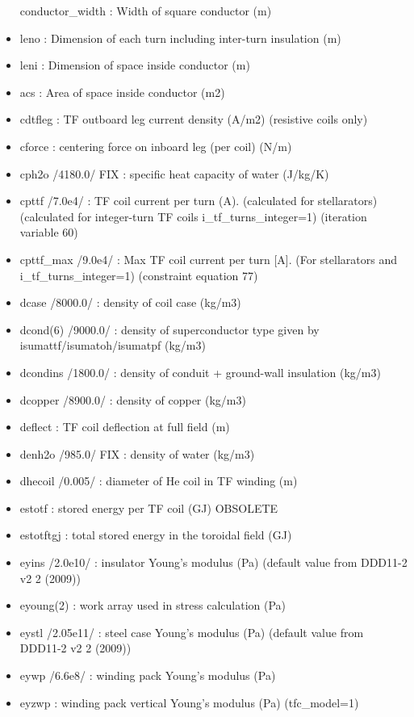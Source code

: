 \documentclass[]{article}
\begin{document}
\begin{itemize}
  conductor\_width : Width of square conductor (m)
\item
  leno : Dimension of each turn including inter-turn insulation (m)
\item
  leni : Dimension of space inside conductor (m)
\item
  acs : Area of space inside conductor (m2)
\item
  cdtfleg : TF outboard leg current density (A/m2) (resistive coils
  only)
\item
  cforce : centering force on inboard leg (per coil) (N/m)
\item
  cph2o /4180.0/ FIX : specific heat capacity of water (J/kg/K)
\item
  cpttf /7.0e4/ : TF coil current per turn (A). (calculated for
  stellarators) (calculated for integer-turn TF coils
  i\_tf\_turns\_integer=1) (iteration variable 60)
\item
  cpttf\_max /9.0e4/ : Max TF coil current per turn {[}A{]}. (For
  stellarators and i\_tf\_turns\_integer=1) (constraint equation 77)
\item
  dcase /8000.0/ : density of coil case (kg/m3)
\item
  dcond(6) /9000.0/ : density of superconductor type given by
  isumattf/isumatoh/isumatpf (kg/m3)
\item
  dcondins /1800.0/ : density of conduit + ground-wall insulation
  (kg/m3)
\item
  dcopper /8900.0/ : density of copper (kg/m3)
\item
  deflect : TF coil deflection at full field (m)
\item
  denh2o /985.0/ FIX : density of water (kg/m3)
\item
  dhecoil /0.005/ : diameter of He coil in TF winding (m)
\item
  estotf : stored energy per TF coil (GJ) OBSOLETE
\item
  estotftgj : total stored energy in the toroidal field (GJ)
\item
  eyins /2.0e10/ : insulator Young's modulus (Pa) (default value from
  DDD11-2 v2 2 (2009))
\item
  eyoung(2) : work array used in stress calculation (Pa)
\item
  eystl /2.05e11/ : steel case Young's modulus (Pa) (default value from
  DDD11-2 v2 2 (2009))
\item
  eywp /6.6e8/ : winding pack Young's modulus (Pa)
\item
  eyzwp : winding pack vertical Young's modulus (Pa) (tfc\_model=1)

\end{itemize}
\end{document}
